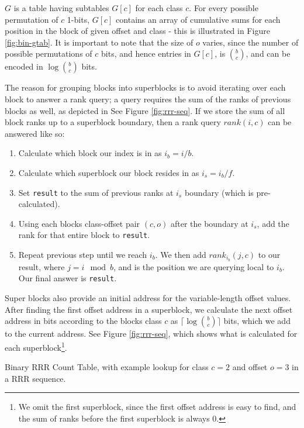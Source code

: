 $G$ is a table having subtables $G[c]$ for each class $c$. For every possible 
permutation of $c$ 1-bits, $G[c]$ contains an array of cumulative sums for each 
position in the block of given offset and class - this is illustrated in Figure \ref{fig:bin-gtab}. It is important to note that 
the size of $o$ varies, since the number of possible permutations of $c$ bits, 
and hence entries in $G[c]$, is $b \choose c$, and can be encoded in $\log {b 
\choose c}$ bits.

The reason for grouping blocks into superblocks is to avoid iterating over each
block to answer a rank query; a query requires the sum of the ranks of previous
blocks as well, as depicted in See Figure \ref{fig:rrr-seq}. If we store the sum 
of all block ranks up to a superblock boundary, then a rank query $rank(i, c)$ 
can be answered like so:

\begin{enumerate}
	\item
		Calculate which block our index is in as $i_b = i / b$.
	\item
		Calculate which superblock our block resides in as $i_s = i_b / f$.
	\item
		Set \texttt{result} to the sum of previous ranks at $i_s$ boundary (which is 
		pre-calculated).
	\item
		Using each blocks class-offset pair $(c, o)$ after the boundary at 
		$i_s$, add the rank for that entire block to \texttt{result}.
	\item
		Repeat previous step until we reach $i_b$. We then add $rank_{i_b}(j, 
		c)$ to our result, where $j = i \mod b$, and is the position we are 
		querying local to $i_b$. Our final answer is \texttt{result}.
\end{enumerate}

Super blocks also provide an initial address for the variable-length offset 
values. After finding the first offset address in a superblock, we calculate the 
next offset address in bits according to the blocks class $c$ as $\lceil\log 
{b \choose c}\rceil$ bits, which we add to the current address. See Figure 
\ref{fig:rrr-seq}, which shows what is calculated for each 
superblock\footnote{We omit the first superblock, since the first offset address 
is easy to find, and the sum of ranks before the first superblock is always 
$0$.}.

		{Binary RRR Count Table, with example lookup for class $c = 2$
		and offset $o = 3$ in a RRR sequence.}

